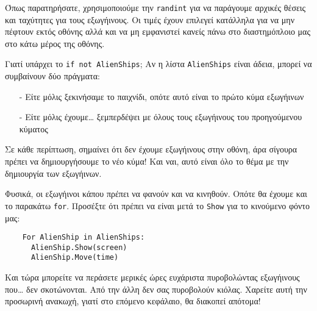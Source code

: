 Όπως παρατηρήσατε, χρησιμοποιούμε την {\tt randint} για να παράγουμε αρχικές θέσεις και ταχύτητες για τους εξωγήινους. Οι τιμές έχουν επιλεγεί κατάλληλα για να μην πέφτουν εκτός οθόνης αλλά και να μη εμφανιστεί κανείς πάνω στο διαστημόπλοιο μας στο κάτω μέρος της οθόνης.

Γιατί υπάρχει το {\tt if not AlienShips}; Αν η λίστα {\tt AlienShips} είναι άδεια, μπορεί να συμβαίνουν δύο πράγματα:
%
\begin{itemize}
\item[-] Είτε μόλις ξεκινήσαμε το παιχνίδι, οπότε αυτό είναι το πρώτο κύμα εξωγήινων
\item[-] Είτε μόλις έχουμε\ldots{} ξεμπερδέψει με όλους τους εξωγήινους του προηγούμενου κύματος
\end{itemize}
%
Σε κάθε περίπτωση, σημαίνει ότι δεν έχουμε εξωγήινους στην οθόνη, άρα σίγουρα πρέπει να δημιουργήσουμε το νέο κύμα! Και ναι, αυτό είναι όλο το θέμα με την δημιουργία των εξωγήινων.

Φυσικά, οι εξωγήινοι κάπου πρέπει να φανούν και να κινηθούν. Οπότε θα έχουμε και το παρακάτω {\tt for}. Προσέξτε ότι πρέπει να είναι μετά το {\tt Show} για το κινούμενο φόντο μας:

\begin{verbatim}
    For AlienShip in AlienShips:
      AlienShip.Show(screen)
      AlienShip.Move(time)
\end{verbatim}

Και τώρα μπορείτε να περάσετε μερικές ώρες ευχάριστα πυροβολώντας εξωγήινους που\ldots{} δεν σκοτώνονται. Από την άλλη δεν σας πυροβολούν κιόλας. Χαρείτε αυτή την προσωρινή ανακωχή, γιατί στο επόμενο κεφάλαιο, θα διακοπεί απότομα!
